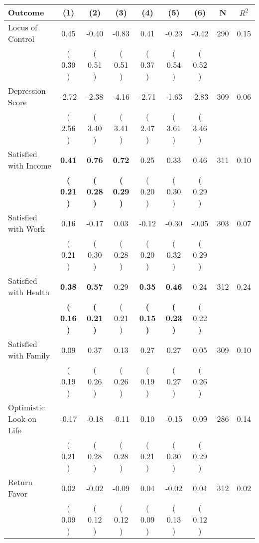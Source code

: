 \begin{tabular}{lcccccccc}
\toprule
 \textbf{Outcome} & \textbf{(1)} & \textbf{(2)} & \textbf{(3)} & \textbf{(4)} & \textbf{(5)} & \textbf{(6)} & \textbf{N} & \textbf{$ R^2$} \\
\midrule
Locus of Control &      0.45 &     -0.40 &     -0.83 &      0.41 &     -0.23 &     -0.42 & 290 &       0.15 \\ 
 & (     0.39 ) & (     0.51 ) & (     0.51 ) & (     0.37 ) & (     0.54 ) & (     0.52 ) & \\
Depression Score &     -2.72 &     -2.38 &     -4.16 &     -2.71 &     -1.63 &     -2.83 & 309 &       0.06 \\ 
 & (     2.56 ) & (     3.40 ) & (     3.41 ) & (     2.47 ) & (     3.61 ) & (     3.46 ) & \\
Satisfied with Income & \textbf{     0.41} & \textbf{     0.76} & \textbf{     0.72} &      0.25 &      0.33 &      0.46 & 311 &       0.10 \\ 
 & \textbf{(     0.21 )} & \textbf{(     0.28 )} & \textbf{(     0.29 )} & (     0.20 ) & (     0.30 ) & (     0.29 ) & \\
Satisfied with Work &      0.16 &     -0.17 &      0.03 &     -0.12 &     -0.30 &     -0.05 & 303 &       0.07 \\ 
 & (     0.21 ) & (     0.30 ) & (     0.28 ) & (     0.20 ) & (     0.32 ) & (     0.29 ) & \\
Satisfied with Health & \textbf{     0.38} & \textbf{     0.57} &      0.29 & \textbf{     0.35} & \textbf{     0.46} &      0.24 & 312 &       0.24 \\ 
 & \textbf{(     0.16 )} & \textbf{(     0.21 )} & (     0.21 ) & \textbf{(     0.15 )} & \textbf{(     0.23 )} & (     0.22 ) & \\
Satisfied with Family &      0.09 &      0.37 &      0.13 &      0.27 &      0.27 &      0.05 & 309 &       0.10 \\ 
 & (     0.19 ) & (     0.26 ) & (     0.26 ) & (     0.19 ) & (     0.27 ) & (     0.26 ) & \\
Optimistic Look on Life &     -0.17 &     -0.18 &     -0.11 &      0.10 &     -0.15 &      0.09 & 286 &       0.14 \\ 
 & (     0.21 ) & (     0.28 ) & (     0.28 ) & (     0.21 ) & (     0.30 ) & (     0.29 ) & \\
Return Favor &      0.02 &     -0.02 &     -0.09 &      0.04 &     -0.02 &      0.04 & 312 &       0.02 \\ 
 & (     0.09 ) & (     0.12 ) & (     0.12 ) & (     0.09 ) & (     0.13 ) & (     0.12 ) & \\

\end{tabular}
